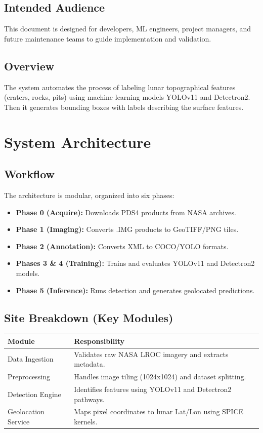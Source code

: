 \documentclass[12pt]{article}
\begin{document}
\subsection{Intended Audience}
This document is designed for developers, ML engineers, project managers, and future maintenance teams to guide implementation and validation.

\subsection{Overview}
The system automates the process of labeling lunar topographical features (craters, rocks, pits) using machine learning models YOLOv11 and Detectron2. Then it generates bounding boxes with labels describing the surface features.

\section{System Architecture}
\subsection{Workflow}
The architecture is modular, organized into six phases:
\begin{itemize}
    \item \textbf{Phase 0 (Acquire):} Downloads PDS4 products from NASA archives.
    \item \textbf{Phase 1 (Imaging):} Converts .IMG products to GeoTIFF/PNG tiles.
    \item \textbf{Phase 2 (Annotation):} Converts XML to COCO/YOLO formats.
    \item \textbf{Phases 3 \& 4 (Training):} Trains and evaluates YOLOv11 and Detectron2 models.
    \item \textbf{Phase 5 (Inference):} Runs detection and generates geolocated predictions.
\end{itemize}

\subsection{Site Breakdown (Key Modules)}
\begin{tabularx}{\textwidth}{l|X}
\toprule
\textbf{Module} & \textbf{Responsibility} \\ \midrule
Data Ingestion & Validates raw NASA LROC imagery and extracts metadata. \\
Preprocessing & Handles image tiling (1024x1024) and dataset splitting. \\
Detection Engine & Identifies features using YOLOv11 and Detectron2 pathways. \\
Geolocation Service & Maps pixel coordinates to lunar Lat/Lon using SPICE kernels. \\
\bottomrule
\end{tabularx}
\end{document}

